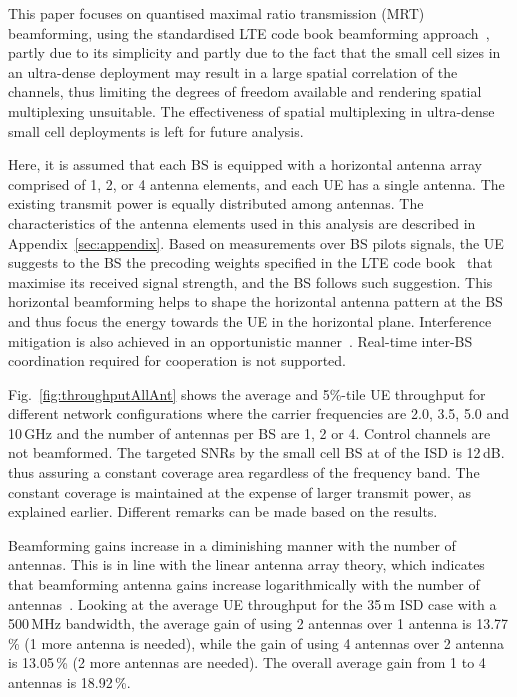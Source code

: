 \documentclass{IEEEtran}
\begin{document}
This paper focuses on quantised maximal ratio transmission (MRT) beamforming,
using the standardised \ac{LTE} code book beamforming approach~\cite{LTEbook},
partly due to its simplicity and partly due to the fact that the small cell sizes in an ultra-dense deployment may result in a large spatial correlation of the channels,
thus limiting the degrees of freedom available and rendering spatial multiplexing unsuitable.
The effectiveness of spatial multiplexing in ultra-dense small cell deployments is left for future analysis.


Here,
it is assumed that
each \ac{BS} is equipped with a horizontal antenna array comprised of 1, 2, or 4 antenna elements,
and each \ac{UE} has a single antenna.
The existing transmit power is equally distributed among antennas.
The characteristics of the antenna elements used in this analysis are described in Appendix~\ref{sec:appendix}.
Based on measurements over \ac{BS} pilots signals,
the \ac{UE} suggests to the \ac{BS} the precoding weights specified in the LTE code book~\cite{TS36211} that maximise its received signal strength,
and the \ac{BS} follows such suggestion.
This horizontal beamforming helps to shape the horizontal antenna pattern at the \ac{BS} and thus focus the energy towards the \ac{UE} in the horizontal plane.
Interference mitigation is also achieved in an opportunistic manner~\cite{Viswanath:02}.
Real-time inter-\ac{BS} coordination required for cooperation is not supported.

Fig.~\ref{fig:throughputAllAnt} shows the average and 5\%-tile UE throughput for different network configurations
where the carrier frequencies are 2.0, 3.5, 5.0 and 10\,GHz and the number of antennas per \ac{BS} are 1, 2 or 4.
Control channels are not beamformed.
The targeted \acp{SNR} by the small cell \ac{BS} at  of the \ac{ISD} is 12\,dB.
thus assuring a constant coverage area regardless of the frequency band.
The constant coverage is maintained at the expense of larger transmit power,
as explained earlier.
Different remarks can be made based on the results.

Beamforming gains increase in a diminishing manner with the number of antennas.
This is in line with the linear antenna array theory,
which indicates that beamforming antenna gains increase logarithmically with the number of antennas~\cite{antennaTheorybook}.
Looking at the average \ac{UE} throughput for the 35\,m \ac{ISD} case with a 500\,MHz bandwidth,
the average gain of using 2 antennas over 1 antenna is 13.77\,\% (1 more antenna is needed),
while the gain of using 4 antennas over 2 antenna is 13.05\,\% (2 more antennas are needed).
The overall average gain from 1 to 4 antennas is 18.92\,\%.
\end{document}
